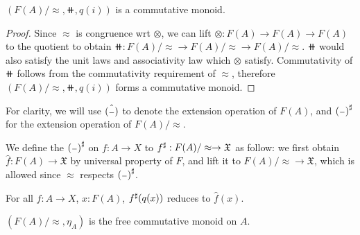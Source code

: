 \begin{proposition}
$(F(A) / \approx, \doubleplus, q(i))$ is a commutative monoid.
\end{proposition}

\begin{proof}
Since $\approx$ is congruence wrt $\otimes$,
we can lift $\otimes : F(A) \to F(A) \to F(A)$ to the quotient to obtain
$\doubleplus : F(A) / \approx \to F(A) / \approx \to F(A) / \approx$.
$\doubleplus$ would also satisfy the unit laws and associativity law which $\otimes$ satisfy.
Commutativity of $\doubleplus$ follows from the commutativity requirement of $\approx$,
therefore $(F(A) / \approx, \doubleplus, q(i))$ forms a commutative monoid.
\end{proof}

For clarity, we will use $\hat{({\scriptstyle{-}})}$ to denote the extension operation of $F(A)$, 
and ${({\scriptstyle{-}})}^{\sharp}$ for the extension operation of $F(A) / \approx$.

\begin{definition}
We define the ${({\scriptstyle{-}})}^{\sharp}$ on $f : A \to X$ to ${f}^{\sharp} : F(A) / \approx \to \mathfrak{X}$ as follow:
we first obtain $\hat{f} : F(A) \to \mathfrak{X}$ by universal property of $F$, and lift it
to $F(A) / \approx \to \mathfrak{X}$, which is allowed since $\approx$ respects ${({\scriptstyle{-}})}^{\sharp}$.
\end{definition}

\begin{proposition}
    For all $f : A \to X$, $x : F(A)$, ${f}^{\sharp}(q(x))$ reduces to $\hat{f}(x)$.
\end{proposition}

\begin{proposition}
    $(F(A) / \approx,\eta_A)$ is the free commutative monoid on $A$.
\end{proposition}

